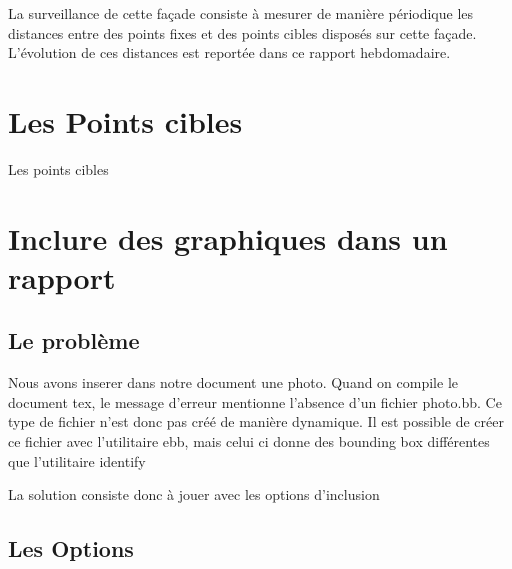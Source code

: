 \documentclass[french]{article}
\begin{document}
La surveillance de cette façade consiste à mesurer de manière périodique les distances 
entre des points fixes et des points cibles disposés sur cette façade.
L'évolution de ces distances est reportée dans ce rapport hebdomadaire.


\section{Les Points cibles}
Les points cibles

\section{Inclure des graphiques dans un rapport}
\subsection{Le problème}
Nous avons inserer dans notre document une photo.
Quand on compile le document tex, le message d'erreur mentionne l'absence d'un fichier photo.bb.
Ce type de fichier n'est donc pas créé de manière dynamique.
Il est possible de créer ce fichier avec l'utilitaire ebb, mais celui ci donne des bounding box
différentes que l'utilitaire identify

La solution consiste donc à jouer avec les options d'inclusion

\subsection{Les Options}
\end{document}
